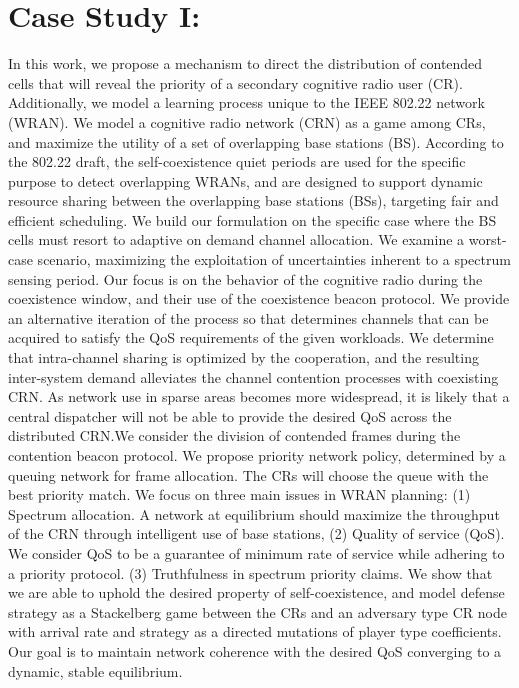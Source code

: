\documentclass[10pt]{article}
\theoremstyle{definition}
\begin{document}
\section{Case Study I:}
In this work, we propose a mechanism to direct the distribution of contended cells that 
will reveal the priority of a secondary cognitive radio user (CR). Additionally, we model 
a learning process unique to the IEEE 802.22 network 
(WRAN). We model a cognitive radio network (CRN) as a game among CRs, and maximize the
 utility of a set of overlapping base stations (BS). According to the 802.22 draft, the 
self-coexistence quiet periods are used for the specific purpose to detect overlapping 
WRANs, and are designed to support dynamic resource sharing between the overlapping base
 stations (BSs), targeting fair and efficient scheduling. We build our formulation on 
the specific case where the BS cells must resort to adaptive on demand channel allocation.
 We examine a worst-case scenario, maximizing the exploitation of uncertainties inherent 
to a spectrum sensing period. Our focus is on the behavior of the cognitive radio 
during the coexistence window, and their use of the coexistence beacon protocol. 
We provide an alternative iteration of the process so that determines channels 
that can be acquired to satisfy the QoS requirements of the given workloads. We 
determine that intra-channel sharing is optimized by the cooperation, and the resulting 
inter-system demand alleviates the channel contention processes with coexisting CRN. 
As network use in sparse areas becomes more widespread, it is likely that a 
central dispatcher will not be able to provide the desired QoS across the distributed 
CRN.We consider the division of contended frames during the contention beacon protocol. 
We propose priority network policy, determined by a queuing network for frame 
allocation. The CRs will choose the queue with the best priority match. We focus on 
three main issues in WRAN planning: (1) Spectrum allocation. A network at equilibrium 
should maximize the throughput of the CRN through intelligent use of base stations, 
(2) Quality of service (QoS). We consider QoS to be a guarantee of minimum rate of 
service while adhering to a priority protocol. (3) Truthfulness in spectrum 
priority claims. We show that we are able to uphold the desired property of 
self-coexistence, and model defense strategy as a Stackelberg game between the CRs and 
an adversary type CR node with arrival rate and strategy as a directed mutations of 
player type coefficients. Our goal is to maintain network coherence with the desired 
QoS converging to a dynamic, stable equilibrium.
\end{document}
